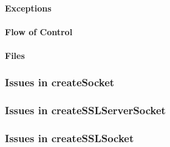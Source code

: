 \paragraph{Exceptions}
\begin{itemize}
\end{itemize}

\paragraph{Flow of Control}
\begin{itemize}
\end{itemize}

\paragraph{Files}
\begin{itemize}
\end{itemize}

\subsubsection{Issues in createSocket}

\subsubsection{Issues in createSSLServerSocket}

\subsubsection{Issues in createSSLSocket}
